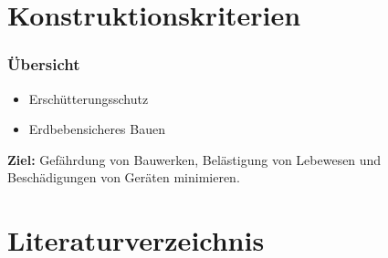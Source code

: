 \documentclass[hyperref={pdfpagemode=FullScreen, colorlinks=false}]{beamer}
\begin{document}
\maketitle


\section{Konstruktionskriterien}

\begin{frame}
\frametitle{Übersicht}
\begin{itemize} %
 \item Erschütterungsschutz   
 \item Erdbebensicheres Bauen
\end{itemize}

\bigskip

\textbf{Ziel:} Gefährdung von Bauwerken, Belästigung von Lebewesen und Beschädigungen von Geräten minimieren.
\end{frame}







\section*{Literaturverzeichnis}

\begin{frame}[allowframebreaks]{}
	\printbibliography
\end{frame}
\end{document}
